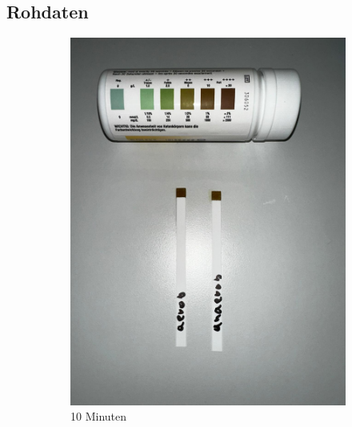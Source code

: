 \documentclass[10pt,a4paper]{article}
\begin{document}
	\subsection{Rohdaten}
		\begin{figure}[H]
		\centering
		\begin{subfigure}[b]{0.4\textwidth}
			\includegraphics[width=\textwidth]{PHOTO-2024-07-04-23-51-30.jpg}
			\caption{10 Minuten}
			\label{fig:10min}
		\end{subfigure}
		\hfill
		\begin{subfigure}[b]{0.4\textwidth}

\end{subfigure}
\end{figure}
\end{document}
